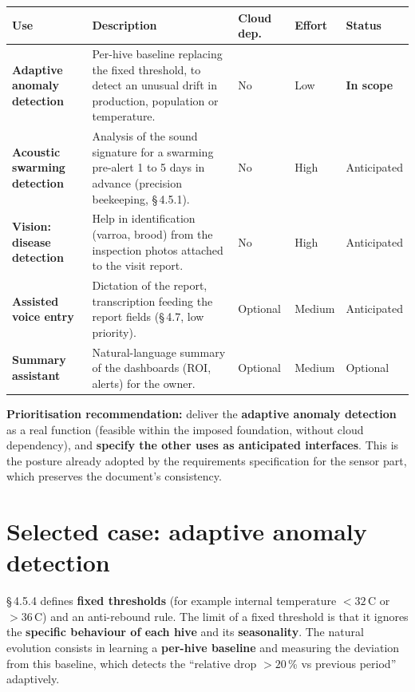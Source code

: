 \begin{xltabular}{\textwidth}{>{\bfseries}p{3.1cm} X C{1.7cm} C{1.7cm} C{1.9cm}}
\toprule
\textbf{Use} & \textbf{Description} & \textbf{Cloud dep.} & \textbf{Effort} & \textbf{Status} \\
\midrule
\endhead
Adaptive anomaly detection &
Per-hive baseline replacing the fixed threshold, to detect an unusual drift in
production, population or temperature. &
No & Low & \textbf{In scope} \\
Acoustic swarming detection &
Analysis of the sound signature for a swarming pre-alert 1 to 5 days in advance
(precision beekeeping, §\,4.5.1). &
No & High & Anticipated \\
Vision: disease detection &
Help in identification (varroa, brood) from the inspection photos attached to
the visit report. &
No & High & Anticipated \\
Assisted voice entry &
Dictation of the report, transcription feeding the report fields
(§\,4.7, low priority). &
Optional & Medium & Anticipated \\
Summary assistant &
Natural-language summary of the dashboards (ROI, alerts) for the owner. &
Optional & Medium & Optional \\
\bottomrule
\end{xltabular}

\begin{encadre}
\textbf{Prioritisation recommendation:} deliver the \textbf{adaptive anomaly
detection} as a real function (feasible within the imposed foundation, without
cloud dependency), and \textbf{specify the other uses as anticipated
interfaces}. This is the posture already adopted by the requirements
specification for the sensor part, which preserves the document's consistency.
\end{encadre}

\section{Selected case: adaptive anomaly detection}
§\,4.5.4 defines \textbf{fixed thresholds} (for example internal temperature
$<32$\,\textdegree C or $>36$\,\textdegree C) and an anti-rebound rule. The limit
of a fixed threshold is that it ignores the \textbf{specific behaviour of each
hive} and its \textbf{seasonality}. The natural evolution consists in learning a
\textbf{per-hive baseline} and measuring the deviation from this baseline, which
detects the ``relative drop $>20$\,\% vs previous period'' adaptively.

